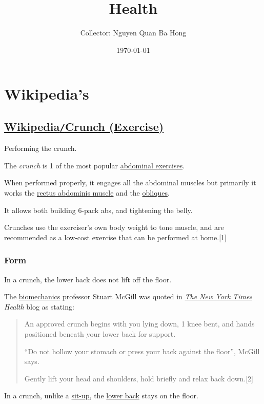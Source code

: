 \documentclass[oneside]{book}
\title{Health}
\author{Collector: Nguyen Quan Ba Hong}
\date{\today}
\numberwithin{equation}{section}
\begin{document}
\maketitle
\setcounter{secnumdepth}{6}
\setcounter{tocdepth}{6}
\tableofcontents


\chapter{Wikipedia's}

\section{\href{https://en.wikipedia.org/wiki/Crunch_(exercise)}{Wikipedia\texttt{/}Crunch (Exercise)}}
\textsf{Performing the crunch.}

The \textit{crunch} is 1 of the most popular \href{https://en.wikipedia.org/wiki/Abdominal_exercise}{abdominal exercises}.

When performed properly, it engages all the abdominal muscles but primarily it works the \href{https://en.wikipedia.org/wiki/Rectus_abdominis_muscle}{rectus abdominis muscle} and the \href{https://en.wikipedia.org/wiki/Abdominal_external_oblique_muscle}{obliques}.

It allows both building 6-pack abs, and tightening the belly.

Crunches use the exerciser's own body weight to tone muscle, and are recommended as a low-cost exercise that can be performed at home.[1]

\subsection{Form}
\textsf{In a crunch, the lower back does not lift off the floor.}

The \href{https://en.wikipedia.org/wiki/Biomechanics}{biomechanics} professor Stuart McGill was quoted in \textit{\href{https://en.wikipedia.org/wiki/The_New_York_Times}{The New York Times} Health} blog as stating:
\begin{quotation}
    An approved crunch begins with you lying down, 1 knee bent, and hands positioned beneath your lower back for support.
    
    ``Do not hollow your stomach or press your back against the floor'', McGill says.
    
    Gently lift your head and shoulders, hold briefly and relax back down.[2]
\end{quotation}
In a crunch, unlike a \href{https://en.wikipedia.org/wiki/Sit-up}{sit-up}, the \href{https://en.wikipedia.org/wiki/Lower_back}{lower back} stays on the floor.
\end{document}
